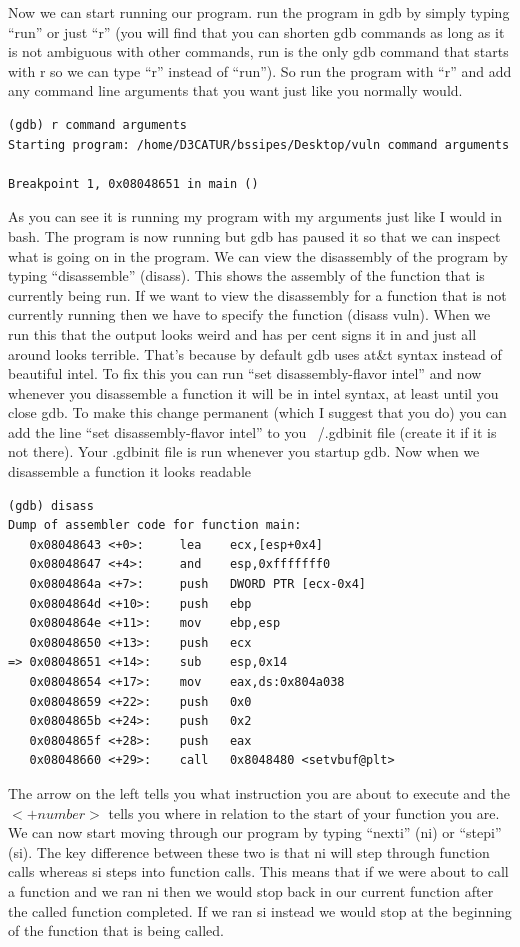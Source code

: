 \documentclass{report}
\begin{document}
Now we can start running our program.  run the program in gdb by simply typing ``run'' or just ``r'' (you will find that you can shorten gdb commands as long as it is not ambiguous with other commands, run is the only gdb command that starts with r so we can type ``r'' instead of ``run'').  So run the program with ``r'' and add any command line arguments that you want just like you normally would.
\begin{lstlisting}
(gdb) r command arguments
Starting program: /home/D3CATUR/bssipes/Desktop/vuln command arguments

Breakpoint 1, 0x08048651 in main ()
\end{lstlisting}
As you can see it is running my program with my arguments just like I would in bash.  The program is now running but gdb has paused it so that we can inspect what is going on in the program.  We can view the disassembly of the program by typing ``disassemble'' (disass).  This shows the assembly of the function that is currently being run.  If we want to view the disassembly for a function that is not currently running then we have to specify the function (disass vuln).  When we run this that the output looks weird and has per cent signs it in and just all around looks terrible.  That's because by default gdb uses at\&t syntax instead of beautiful intel.  To fix this you can run ``set disassembly-flavor intel'' and now whenever you disassemble a function it will be in intel syntax, at least until you close gdb.  To make this change permanent (which I suggest that you do) you can add the line ``set disassembly-flavor intel'' to you ~/.gdbinit file (create it if it is not there).  Your .gdbinit file is run whenever you startup gdb.  Now when we disassemble a function it looks readable
\begin{lstlisting}
(gdb) disass
Dump of assembler code for function main:
   0x08048643 <+0>:     lea    ecx,[esp+0x4]
   0x08048647 <+4>:     and    esp,0xfffffff0
   0x0804864a <+7>:     push   DWORD PTR [ecx-0x4]
   0x0804864d <+10>:    push   ebp
   0x0804864e <+11>:    mov    ebp,esp
   0x08048650 <+13>:    push   ecx
=> 0x08048651 <+14>:    sub    esp,0x14
   0x08048654 <+17>:    mov    eax,ds:0x804a038
   0x08048659 <+22>:    push   0x0
   0x0804865b <+24>:    push   0x2
   0x0804865f <+28>:	push   eax
   0x08048660 <+29>:	call   0x8048480 <setvbuf@plt>
\end{lstlisting}
The arrow on the left tells you what instruction you are about to execute and the $<+number>$ tells you where in relation to the start of your function you are.  We can now start moving through our program by typing ``nexti'' (ni) or ``stepi'' (si).  The key difference between these two is that ni will step through function calls whereas si steps into function calls.  This means that if we were about to call a function and we ran ni then we would stop back in our current function after the called function completed.  If we ran si instead we would stop at the beginning of the function that is being called.
\end{document}
